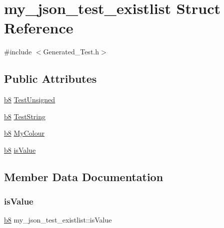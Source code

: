 \hypertarget{structmy__json__test__existlist}{}\section{my\+\_\+json\+\_\+test\+\_\+existlist Struct Reference}
\label{structmy__json__test__existlist}


{\ttfamily \#include $<$Generated\+\_\+\+Test.\+h$>$}

\subsection*{Public Attributes}
\begin{DoxyCompactItemize}
\item 
\hyperlink{ab__common_8h_a70e369648385b50f2d0588e8e8745275}{b8} \hyperlink{structmy__json__test__existlist_abcc3320a088be44f3780f7768da67efa}{Test\+Unsigned}
\item 
\hyperlink{ab__common_8h_a70e369648385b50f2d0588e8e8745275}{b8} \hyperlink{structmy__json__test__existlist_ad1bf35a0d6153e177322567228ae0203}{Test\+String}
\item 
\hyperlink{ab__common_8h_a70e369648385b50f2d0588e8e8745275}{b8} \hyperlink{structmy__json__test__existlist_adc7bd401b4e560999733be88e43b5b7f}{My\+Colour}
\item 
\hyperlink{ab__common_8h_a70e369648385b50f2d0588e8e8745275}{b8} \hyperlink{structmy__json__test__existlist_ad8b82af159a6dd0709800ca082156caf}{is\+Value}
\end{DoxyCompactItemize}


\subsection{Member Data Documentation}
\mbox{\label{structmy__json__test__existlist_ad8b82af159a6dd0709800ca082156caf}} 
\subsubsection{\texorpdfstring{is\+Value}{isValue}}
{\footnotesize\ttfamily \hyperlink{ab__common_8h_a70e369648385b50f2d0588e8e8745275}{b8} my\+\_\+json\+\_\+test\+\_\+existlist\+::is\+Value}

